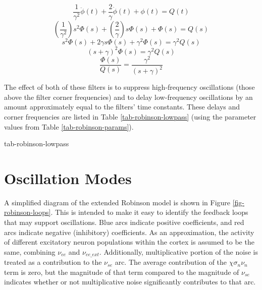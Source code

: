 \begin{equation}
\frac{1}{\gamma^2} \ddot{\phi}(t) + \frac{2}{\gamma} \dot{\phi}(t) + \phi(t)
= Q(t)
\end{equation}
%
\begin{equation}
\left ( \frac{1}{\gamma^2} \right ) s^2 \Phi(s)
+ \left ( \frac{2}{\gamma} \right ) s \Phi(s) + \Phi(s) = Q(s)
\end{equation}
%
\begin{equation}
s^2 \Phi(s) + 2 \gamma s \Phi(s) + \gamma^2 \Phi(s) = \gamma^2 Q(s)
\end{equation}
%
\begin{equation}
(s + \gamma)^2 \Phi(s) = \gamma^2 Q(s)
\end{equation}
%
\begin{equation}
\frac{\Phi(s)}{Q(s)} = \frac{\gamma^2}{(s + \gamma)^2}
\label{eq-robinson-lowpass-gamma}
\end{equation}

The effect of both of these filters is to suppress high-frequency
oscillations (those above the filter corner frequencies) and to delay
low-frequency oscillations by an amount approximately equal to the filters'
time constants. These delays and corner frequencies are listed in Table
\ref{tab-robinson-lowpass} (using the parameter values from Table
\ref{tab-robinson-params}).

{tab-robinson-lowpass}

%
%
\section{Oscillation Modes}
\label{sect-robinson-math-modes}

A simplified diagram of the extended Robinson model is shown in Figure
\ref{fig-robinson-loops}. This is intended to make it easy to identify the
feedback loops that may support oscillations. Blue arcs indicate positive
coefficients, and red arcs indicate negative (inhibitory) coefficients.
As an approximation, the activity of different excitatory neuron populations
within the cortex is assumed to be the same, combining $\nu_{ee}$ and
$\nu_{ee\_ext}$. Additionally, multiplicative portion of the noise is
treated as a contribution to the $\nu_{se}$ arc. The average contribution of
the $\chi \sigma_n \nu_n$ term is zero, but the magnitude of that term
compared to the magnitude of $\nu_{se}$ indicates whether or not
multiplicative noise significantly contributes to that arc.

